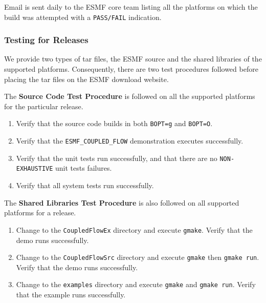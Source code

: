 Email is sent daily to the ESMF core team listing all the platforms on which the build was attempted with a {\tt PASS/FAIL} indication. 

\subsubsection{Testing for Releases}

We provide two types of tar files, the ESMF source and the shared
libraries of the supported platforms. Consequently, there are two test
procedures followed before placing the tar files on the ESMF download website. 

The {\bf Source Code Test Procedure} is followed on all the supported
platforms for the particular release.

\begin{enumerate}
\item Verify that the source code builds in both {\tt BOPT=g} and {\tt BOPT=O}.
\item Verify that  the {\tt ESMF\_COUPLED\_FLOW} demonstration executes successfully.
\item Verify that the unit tests run successfully, and that there are no {\tt NON-EXHAUSTIVE} unit tests  failures.
\item Verify that all system tests run successfully. 
\end{enumerate}

The {\bf Shared Libraries Test Procedure} is also followed on all supported
platforms for a release.

\begin{enumerate}
\item Change to the {\tt CoupledFlowEx} directory and execute {\tt gmake}. Verify that the demo runs successfully.
\item Change to the {\tt CoupledFlowSrc} directory and execute {\tt gmake} then {\tt gmake run}. Verify that the demo runs successfully.
\item Change to the {\tt examples} directory and execute {\tt gmake} and {\tt gmake run}. Verify that the example runs successfully.
\end{enumerate}














